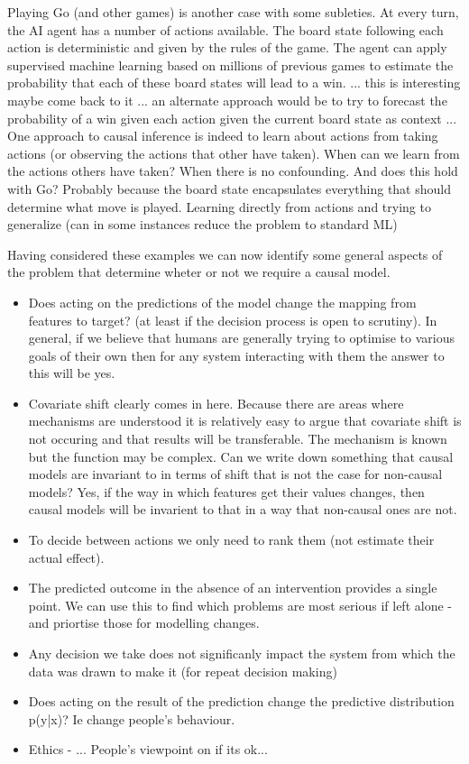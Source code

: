 \documentclass[11pt,a4paper,oneside]{book}
\begin{document}
Playing Go (and other games) is another case with some subleties. At every turn, the AI agent has a number of actions available. The board state following each action is deterministic and given by the rules of the game. The agent can apply supervised machine learning based on millions of previous games to estimate the probability that each of these board states will lead to a win. ... this is interesting maybe come back to it ... an alternate approach would be to try to forecast the probability of a win given each action given the current board state as context ... One approach to causal inference is indeed to learn about actions from taking actions (or observing the actions that other have taken). When can we learn from the actions others have taken? When there is no confounding. And does this hold with Go? Probably because the board state encapsulates everything that should determine what move is played. Learning directly from actions and trying to generalize (can in some instances reduce the problem to standard ML)

Having considered these examples we can now identify some general aspects of the problem that determine wheter or not we require a causal model.

\begin{itemize}
\item Does acting on the predictions of the model change the mapping from features to target? (at least if the decision process is open to scrutiny). In general, if we believe that humans are generally trying to optimise to various goals of their own then for any system interacting with them the answer to this will be yes.
\item 

 Covariate shift clearly comes in here. Because there are areas where mechanisms are understood it is relatively easy to argue that covariate shift is not occuring and that results will be transferable. The mechanism is known but the function may be complex. Can we write down something that causal models are invariant to in terms of shift that is not the case for non-causal models? Yes, if the way in which features get their values changes, then causal models will be invarient to that in a way that non-causal ones are not. 
 
\item To decide between actions we only need to rank them (not estimate their actual effect). 
\item The predicted outcome in the absence of an intervention provides a single point. We can use this to find which problems are most serious if left alone - and priortise those for modelling changes. 
\item Any decision we take does not significanly impact the system from which the data was drawn to make it (for repeat decision making)
\item Does acting on the result of the prediction change the predictive distribution p(y|x)? Ie change people's behaviour.
\item Ethics - ... People's viewpoint on if its ok...
\end{itemize}
\end{document}
